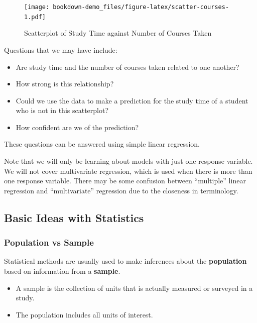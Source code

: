 \documentclass[
]{book}
\providecommand{\tightlist}{%
  \setlength{\itemsep}{0pt}\setlength{\parskip}{0pt}}
\begin{document}
\begin{figure}
\centering
\texttt{[image: bookdown-demo\_files/figure-latex/scatter-courses-1.pdf]}
\caption{\label{fig:scatter-courses}Scatterplot of Study Time against Number of Courses Taken}
\end{figure}

Questions that we may have include:

\begin{itemize}
\tightlist
\item
  Are study time and the number of courses taken related to one another?
\item
  How strong is this relationship?
\item
  Could we use the data to make a prediction for the study time of a student who is not in this scatterplot?
\item
  How confident are we of the prediction?
\end{itemize}

These questions can be answered using simple linear regression.

Note that we will only be learning about models with just one response variable. We will not cover multivariate regression, which is used when there is more than one response variable. There may be some confusion between ``multiple'' linear regression and ``multivariate'' regression due to the closeness in terminology.

\hypertarget{basic-ideas-with-statistics}{%
\subsection{Basic Ideas with Statistics}\label{basic-ideas-with-statistics}}

\hypertarget{population-vs-sample}{%
\subsubsection{Population vs Sample}\label{population-vs-sample}}

Statistical methods are usually used to make inferences about the \textbf{population} based on information from a \textbf{sample}.

\begin{itemize}
\tightlist
\item
  A sample is the collection of units that is actually measured or surveyed in a study.
\item
  The population includes all units of interest.
\end{itemize}
\end{document}

